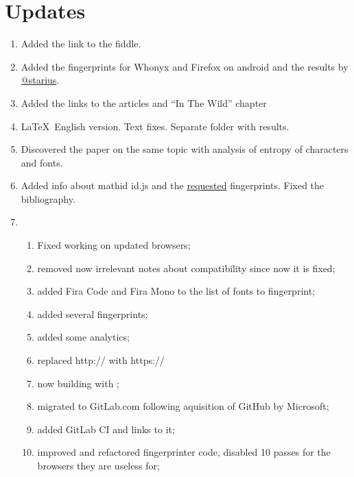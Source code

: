 \documentclass[letterpaper,14pt]{article}
\begin{document}
\section{Updates}\label{updates}
\begin{enumerate}
\itemsep1pt\parskip0pt
\item
  Added the link to the fiddle.
\item
  Added the fingerprints for Whonyx and Firefox on android and the
  results by \href{https://habr.com/users/starius/}{@starius}.
\item
  Added the links to the articles and ``In The Wild'' chapter
\item
   \LaTeX\ English version. Text fixes. Separate folder with results.
\item
   Discovered the paper\cite{Fifield2015} on the same topic with analysis of entropy of characters and fonts.
\item
   Added info about mathid id.js and the \href{https://trac.torproject.org/projects/tor/ticket/13400#comment:12}{requested} fingerprints. Fixed the bibliography.
\item \begin{enumerate}
   \item Fixed working on updated browsers;
   \item removed now irrelevant notes about compatibility since now it is fixed;
   \item added Fira Code and Fira Mono to the list of fonts to fingerprint;
   \item added several fingerprints;
   \item added some analytics;
   \item replaced http:// with https://
   \item now building with \XeTeX;
   \item migrated to GitLab.com following aquisition of GitHub by Microsoft;
   \item added GitLab CI and links to it;
   \item improved and refactored fingerprinter code, disabled 10 passes for the browsers they are useless for;
   \end{enumerate}
\end{enumerate}
{\footnotesize}
\appendix
\end{document}
